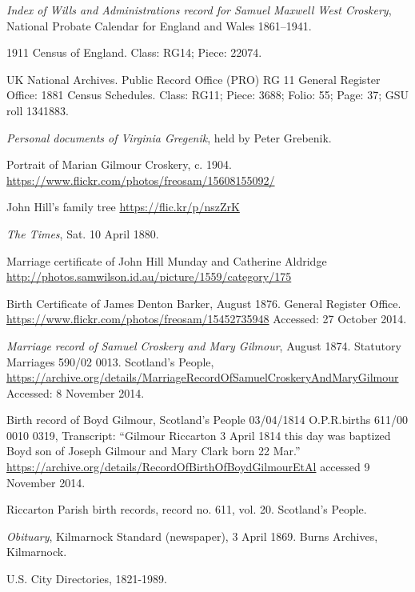 \begin{thebibliography}{99}
	\emph{Index of Wills and Administrations record for Samuel Maxwell West Croskery},
	National Probate Calendar for England and Wales 1861--1941.

	1911 Census of England. Class: RG14; Piece: 22074.

	UK National Archives. Public Record Office (PRO) RG 11 General Register Office: 1881 Census Schedules.
	Class: RG11; Piece: 3688; Folio: 55; Page: 37; GSU roll 1341883.

	\emph{Personal documents of Virginia Gregenik}, held by Peter Grebenik.

	Portrait of Marian Gilmour Croskery, c. 1904.
	\url{https://www.flickr.com/photos/freosam/15608155092/}

	John Hill's family tree \url{https://flic.kr/p/nszZrK}

	\emph{The Times}, Sat. 10 April 1880. 

	Marriage certificate of John Hill Munday and Catherine Aldridge
	\url{http://photos.samwilson.id.au/picture/1559/category/175}

	Birth Certificate of James Denton Barker, August 1876. General Register Office.
	\url{https://www.flickr.com/photos/freosam/15452735948}
	Accessed: 27 October 2014.

	\emph{Marriage record of Samuel Croskery and Mary Gilmour}, August 1874.
	Statutory Marriages 590/02 0013. Scotland's People,
	\url{https://archive.org/details/MarriageRecordOfSamuelCroskeryAndMaryGilmour}
	Accessed: 8 November 2014.

	Birth record of Boyd Gilmour,
	Scotland's People 03/04/1814 O.P.R.births 611/00 0010 0319,
	Transcript: ``Gilmour Riccarton 3 April 1814 this day was baptized Boyd son of Joseph Gilmour and Mary Clark born 22 Mar.''
	\url{https://archive.org/details/RecordOfBirthOfBoydGilmourEtAl} accessed 9 November 2014.

	Riccarton Parish birth records, record no. 611, vol. 20. Scotland's People.

	\emph{Obituary}, Kilmarnock Standard (newspaper), 3 April 1869. Burns Archives, Kilmarnock.

	U.S. City Directories, 1821-1989.


\end{thebibliography}
